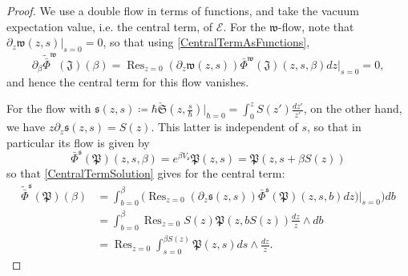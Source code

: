 \documentclass[10pt,a4paper,oneside,no-math,reqno]{amsart}%
\theoremstyle{plain}
\theoremstyle{definition}
\theoremstyle{remark}
\numberwithin{equation}{section}
\newcommand{\mf}[1]{\mathfrak{#1}}
\newcommand{\mc}[1]{\mathcal{#1}}
\newcommand{\1}{\mathds{1}}
\newcommand{\<}{\langle}
\renewcommand{\>}{\rangle}
\newcommand{\del}{\partial}
\DeclareMathOperator*{\Res}{Res}
\begin{document}
\begin{proof}

    We use a double flow in terms of functions, and take the vacuum expectation value, i.e. the central term, of $ \mc{E}$.
    For the $ \mf{w}$-flow, note that $ \del_z \mf{w} (z,s) \Big|_{s=0} = 0$, so that using \cref{CentralTermAsFunctions},
    \begin{equation}
        \del_\beta \tilde{\bar{\Phi}}^{\mf{w}}(\mf{J}) ( \beta) 
        =
        \Res_{z=0} ( \del_z \mf{w}(z,s)) \bar{\Phi}^{\mf{w}}(\mf{J}) (z, s, \beta ) dz \Big|_{s = 0}
        =
        0,
    \end{equation}
    and hence the central term for this flow vanishes.\par
    For the flow with $ \mf{s} (z,s) \coloneqq \hbar \check{\mf{S}}(z,\frac{s}{\hbar} ) \Big|_{\hbar = 0} = \int_0^z S(z') \frac{dz'}{z'}$, on the other hand, we have $ z \del_z \mf{s} (z,s) = S(z)$. This latter is independent of $s$, so that in particular its flow is given by
    \begin{equation}
        \bar{\Phi}^{\mf{s}} (\mf{P} ) (z, s, \beta)
        =
        e^{\beta V_\mf{s}} \mf{P}(z,s)
        =
        \mf{P} (z, s + \beta S(z) )
    \end{equation}
    so that \cref{CentralTermSolution} gives for the central term:
    \begin{equation}
        \begin{split}
            \tilde{\bar{\Phi}}^{\mf{s}} (\mf{P}) (\beta)
            &=
            \int_{b = 0}^\beta \Big( \Res_{z=0} ( \del_z \mf{s}(z,s)) \bar{\Phi}^{\mf{s}}(\mf{P}) (z, s, b ) dz ) \Big|_{s = 0} \Big) db
            \\
            &=
            \int_{b = 0}^\beta \Res_{z=0} S(z) \mf{P} (z, b S(z) ) \frac{dz}{z} \wedge db
            \\
            &=
            \Res_{z=0} \int_{s = 0}^{\beta S(z)}  \mf{P} (z, s ) ds \wedge \frac{dz}{z}.
        \end{split}
    \end{equation}


\end{proof}
\end{document}
